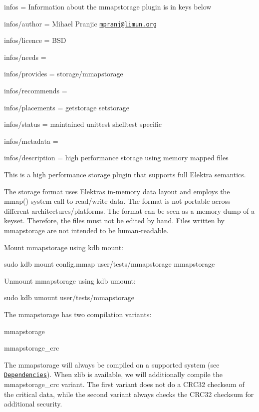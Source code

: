 
\begin{DoxyItemize}
\item infos = Information about the mmapstorage plugin is in keys below
\item infos/author = Mihael Pranjic \href{mailto:mpranj@limun.org}{\tt mpranj@limun.\+org}
\item infos/licence = B\+SD
\item infos/needs =
\item infos/provides = storage/mmapstorage
\item infos/recommends =
\item infos/placements = getstorage setstorage
\item infos/status = maintained unittest shelltest specific
\item infos/metadata =
\item infos/description = high performance storage using memory mapped files
\end{DoxyItemize}

This is a high performance storage plugin that supports full Elektra semantics.

The storage format uses Elektra\textquotesingle{}s in-\/memory data layout and employs the {\ttfamily mmap()} system call to read/write data. The format is not portable across different architectures/platforms. The format can be seen as a memory dump of a keyset. Therefore, the files must not be edited by hand. Files written by mmapstorage are not intended to be human-\/readable.

Mount mmapstorage using {\ttfamily kdb mount}\+:


\begin{DoxyCode}
sudo kdb mount config.mmap user/tests/mmapstorage mmapstorage
\end{DoxyCode}


Unmount mmapstorage using {\ttfamily kdb umount}\+:


\begin{DoxyCode}
sudo kdb umount user/tests/mmapstorage
\end{DoxyCode}


The mmapstorage has two compilation variants\+:


\begin{DoxyEnumerate}
\item mmapstorage
\item mmapstorage\+\_\+crc
\end{DoxyEnumerate}

The {\ttfamily mmapstorage} will always be compiled on a supported system (see \href{#dependencies}{\tt Dependencies}). When zlib is available, we will additionally compile the {\ttfamily mmapstorage\+\_\+crc} variant. The first variant does not do a C\+R\+C32 checksum of the critical data, while the second variant always checks the C\+R\+C32 checksum for additional security.

